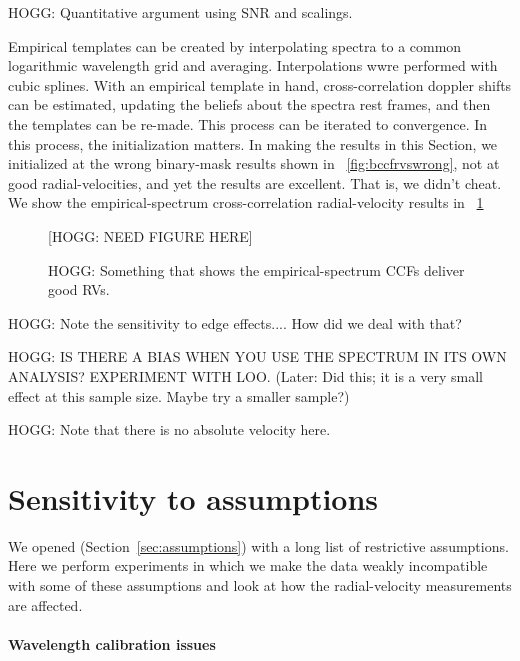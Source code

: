 \documentclass[modern]{aastex631}
\newcommand{\sectionname}{Section}
\newcommand{\secref}[1]{\sectionname~\ref{#1}}
\newcommand{\figref}[1]{\figurename~\ref{#1}}
\begin{document}
HOGG: Quantitative argument using SNR and scalings.

Empirical templates can be created by interpolating spectra to a common logarithmic wavelength grid and averaging.
Interpolations wwre performed with cubic splines.
With an empirical template in hand, cross-correlation doppler shifts can be estimated, updating the beliefs about the spectra rest frames, and then the templates can be re-made.
This process can be iterated to convergence.
In this process, the initialization matters.
In making the results in this \sectionname, we initialized at the wrong binary-mask results shown in \figref{fig:bccfrvswrong}, not at good radial-velocities, and yet the results are excellent.
That is, we didn't cheat.
We show the empirical-spectrum cross-correlation radial-velocity results in \figref{fig:empiricalrvs}

\begin{figure}[t]
  \begin{mdframed}
    \begin{center}
    [HOGG: NEED FIGURE HERE]
    \end{center}
    \caption{HOGG: Something that shows the empirical-spectrum CCFs deliver good RVs.\label{fig:empiricalrvs}}
  \end{mdframed}
\end{figure}

HOGG: Note the sensitivity to edge effects.... How did we deal with that?

HOGG: IS THERE A BIAS WHEN YOU USE THE SPECTRUM IN ITS OWN ANALYSIS? EXPERIMENT WITH LOO. (Later: Did this; it is a very small effect at this sample size. Maybe try a smaller sample?)

HOGG: Note that there is no absolute velocity here.

\section{Sensitivity to assumptions}\label{sec:sensitivity}

We opened (\secref{sec:assumptions}) with a long list of restrictive assumptions.
Here we perform experiments in which we make the data weakly incompatible with some of these assumptions and look at how the radial-velocity measurements are affected.

\noindent
\paragraph{Wavelength calibration issues}
\end{document}
